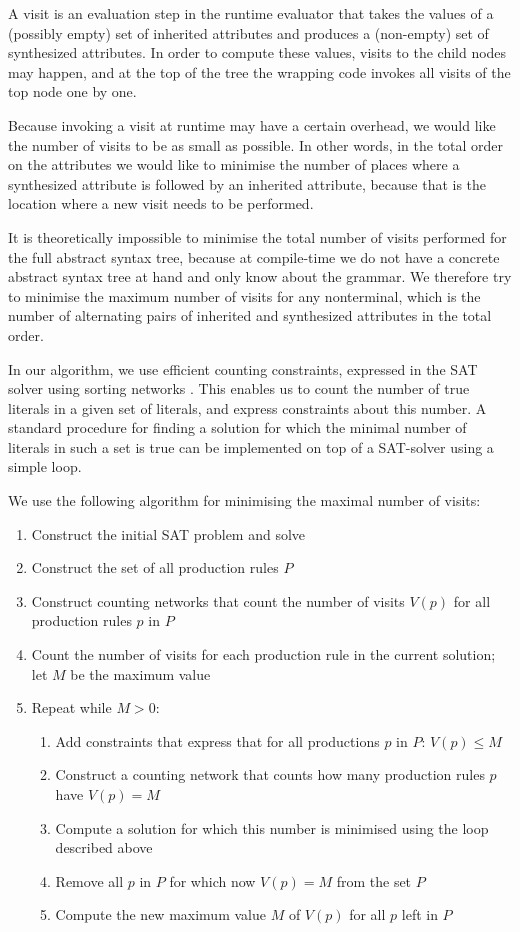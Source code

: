 \documentclass{llncs}
\begin{document}
A visit is an evaluation step in the runtime evaluator that takes the values of a (possibly empty) set of inherited attributes and produces a (non-empty) set of synthesized attributes. In order to compute these values, visits to the child nodes may happen, and at the top of the tree the wrapping code invokes all visits of the top node one by one.

Because invoking a visit at runtime may have a certain overhead, we would like the number of visits to be as small as possible. In other words, in the total order on the attributes we would like to minimise the number of places where a synthesized attribute is followed by an inherited attribute, because that is the location where a new visit needs to be performed.

It is theoretically impossible to minimise the total number of visits performed for the full abstract syntax tree, because at compile-time we do not have a concrete abstract syntax tree at hand and only know about the grammar. We therefore try to minimise the maximum number of visits for any nonterminal, which is the number of alternating pairs of inherited and synthesized attributes in the total order.

In our algorithm, we use efficient counting constraints, expressed in the SAT solver using sorting networks \cite{counting-sorting}. This enables us to count the number of true literals in a given set of literals, and express constraints about this number. A standard procedure for finding a solution for which the minimal number of literals in such a set is true can be implemented on top of a SAT-solver using a simple loop.

We use the following algorithm for minimising the maximal number of visits:
\begin{enumerate}
\item Construct the initial SAT problem and solve
\item Construct the set of all production rules $P$
\item Construct counting networks that count the number of visits $V(p)$ for all production rules $p$ in $P$
\item Count the number of visits for each production rule in the current solution; let $M$ be the maximum value 
\item Repeat while $M > 0$:
\begin{enumerate}
\item Add constraints that express that for all productions $p$ in $P$: $V(p) \leq M$
\item Construct a counting network that counts how many production rules $p$ have $V(p)=M$
\item Compute a solution for which this number is minimised using the loop described above
\item Remove all $p$ in $P$ for which now $V(p) = M$ from the set $P$
\item Compute the new maximum value $M$ of $V(p)$ for all $p$ left in $P$
\end{enumerate}
\end{enumerate}
\end{document}
